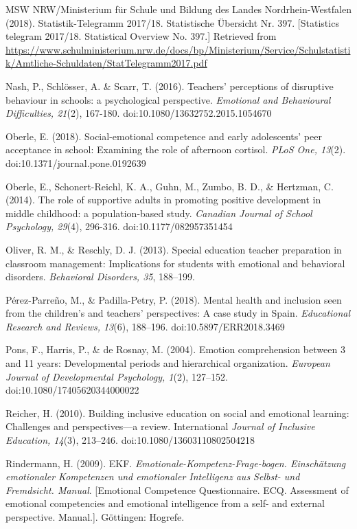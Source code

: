 \documentclass[11.5pt]{sig-alternate} %
\begin{document}
MSW NRW/Ministerium für Schule und Bildung des Landes Nordrhein-Westfalen (2018). Statistik-Telegramm 2017/18. Statistische Übersicht Nr. 397. [Statistics telegram 2017/18. Statistical Overview No. 397.] Retrieved from \url{https://www.schulministerium.nrw.de/docs/bp/Ministerium/Service/Schulstatistik/Amtliche-Schuldaten/StatTelegramm2017.pdf}

Nash, P., Schlösser, A. \& Scarr, T. (2016). Teachers’ perceptions of disruptive behaviour in schools: a psychological perspective. \textit{Emotional and Behavioural Difficulties, 21}(2), 167-180. doi:10.1080/13632752.2015.1054670

Oberle, E. (2018). Social-emotional competence and early adolescents’ peer acceptance in school: Examining the role of afternoon cortisol. \textit{PLoS One, 13}(2). doi:10.1371/\-journal.pone.0192639

Oberle, E., Schonert-Reichl, K. A., Guhn, M., Zumbo, B. D., \& Hertzman, C. (2014). The role of supportive adults in promoting positive development in middle childhood: a population-based study. \textit{Canadian Journal of School Psychology, 29}(4), 296-316. doi:10.1177/082957351454

Oliver, R. M., \& Reschly, D. J. (2013). Special education teacher preparation in classroom management: Implications for students with emotional and behavioral disorders. \textit{Behavioral Disorders, 35}, 188–199.

Pérez-Parre\~no, M., \& Padilla-Petry, P. (2018). Mental health and inclusion seen from the children’s and teachers’ perspectives: A case study in Spain. \textit{Educational Research and Reviews, 13}(6), 188–196. doi:10.5897/ERR2018.3469

Pons, F., Harris, P., \& de Rosnay, M. (2004). Emotion comprehension between 3 and 11 years: Developmental periods and hierarchical organization.\textit{ European Journal of Developmental Psychology, 1}(2), 127–152. doi:10.1080/17405620344000022

Reicher, H. (2010). Building inclusive education on social and emotional learning: Challenges and perspectives—a review. International \textit{Journal of Inclusive Education, 14}(3), 213–246. doi:10.1080/13603110802504218

Rindermann, H. (2009). EKF. \textit{Emotionale-Kompetenz-Frage-bogen. Einschätzung emotionaler Kompetenzen und emotionaler Intelligenz aus Selbst- und Fremdsicht. Manual}. [Emotional Competence Questionnaire. ECQ. Assessment of emotional competencies and emotional intelligence from a self- and external perspective. Manual.]. Göttingen: Hogrefe.
\end{document}
